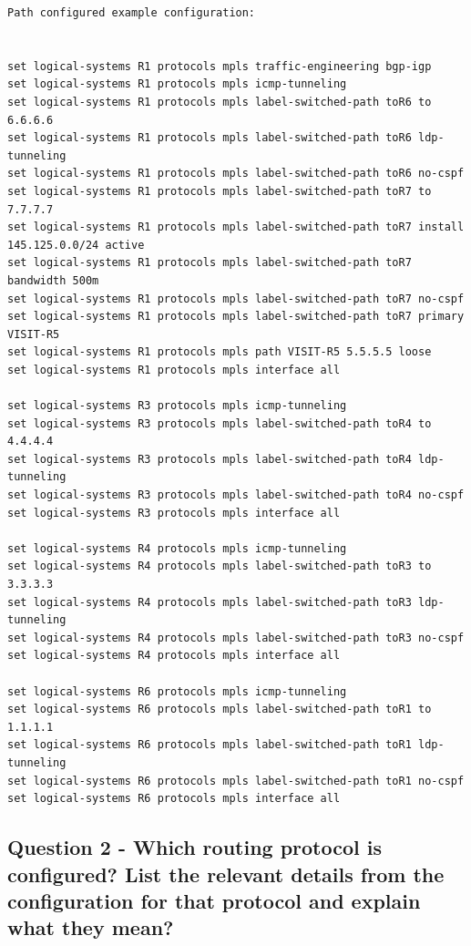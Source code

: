 \documentclass[a4paper]{article}
\begin{document}
\begin{verbatim}
Path configured example configuration:


set logical-systems R1 protocols mpls traffic-engineering bgp-igp
set logical-systems R1 protocols mpls icmp-tunneling
set logical-systems R1 protocols mpls label-switched-path toR6 to 6.6.6.6
set logical-systems R1 protocols mpls label-switched-path toR6 ldp-tunneling
set logical-systems R1 protocols mpls label-switched-path toR6 no-cspf
set logical-systems R1 protocols mpls label-switched-path toR7 to 7.7.7.7
set logical-systems R1 protocols mpls label-switched-path toR7 install 145.125.0.0/24 active
set logical-systems R1 protocols mpls label-switched-path toR7 bandwidth 500m
set logical-systems R1 protocols mpls label-switched-path toR7 no-cspf
set logical-systems R1 protocols mpls label-switched-path toR7 primary VISIT-R5
set logical-systems R1 protocols mpls path VISIT-R5 5.5.5.5 loose
set logical-systems R1 protocols mpls interface all

set logical-systems R3 protocols mpls icmp-tunneling
set logical-systems R3 protocols mpls label-switched-path toR4 to 4.4.4.4
set logical-systems R3 protocols mpls label-switched-path toR4 ldp-tunneling
set logical-systems R3 protocols mpls label-switched-path toR4 no-cspf
set logical-systems R3 protocols mpls interface all

set logical-systems R4 protocols mpls icmp-tunneling
set logical-systems R4 protocols mpls label-switched-path toR3 to 3.3.3.3
set logical-systems R4 protocols mpls label-switched-path toR3 ldp-tunneling
set logical-systems R4 protocols mpls label-switched-path toR3 no-cspf
set logical-systems R4 protocols mpls interface all

set logical-systems R6 protocols mpls icmp-tunneling
set logical-systems R6 protocols mpls label-switched-path toR1 to 1.1.1.1
set logical-systems R6 protocols mpls label-switched-path toR1 ldp-tunneling
set logical-systems R6 protocols mpls label-switched-path toR1 no-cspf
set logical-systems R6 protocols mpls interface all

\end{verbatim}



\subsection{Question 2 - Which routing protocol is configured? List the relevant details from the configuration for that protocol and explain what they mean?}
\end{document}
